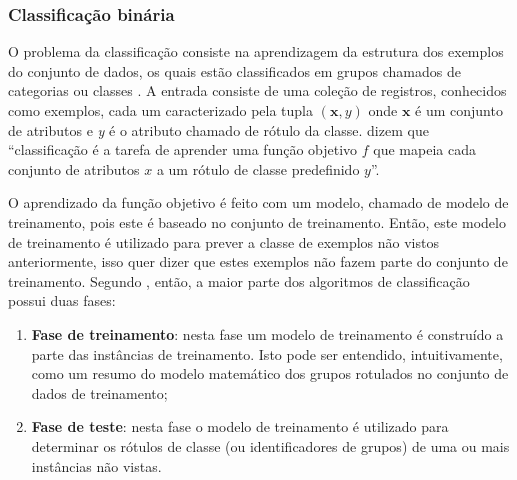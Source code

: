         \subsubsection{Classificação binária} \label{subsubsec:Classificação-binária}
            O problema da classificação consiste na aprendizagem da estrutura dos exemplos do conjunto de dados, os quais estão classificados em grupos chamados de categorias ou classes \cite[p.~285]{Aggarwal_DMTT_2015}.
            A entrada consiste de uma coleção de registros, conhecidos como exemplos, cada um caracterizado pela tupla $(\textbf{x},y)$ onde $\textbf{x}$ é um conjunto de atributos e \textit{y} é o atributo chamado de rótulo da classe.
             dizem que ``classificação é a tarefa de aprender uma função objetivo $f$ que mapeia cada conjunto de atributos $x$ a um rótulo de classe predefinido $y$''.
        
            O aprendizado da função objetivo é feito com um modelo, chamado de modelo de treinamento, pois este é baseado no conjunto de treinamento. 
            Então, este modelo de treinamento é utilizado para prever a classe de exemplos não vistos anteriormente, isso quer dizer que estes exemplos não fazem parte do conjunto de treinamento.
            Segundo , então, a maior parte dos algoritmos de classificação possui duas fases:
            \begin{enumerate}
                \item \textbf{Fase de treinamento}: nesta fase um modelo de treinamento é construído a parte das instâncias de treinamento. Isto pode ser entendido, intuitivamente, como um resumo do modelo matemático dos grupos rotulados no conjunto de dados de treinamento;
                
                \item \textbf{Fase de teste}: nesta fase o modelo de treinamento é utilizado para determinar os rótulos de classe (ou identificadores de grupos) de uma ou mais instâncias não vistas.
            \end{enumerate}
                
